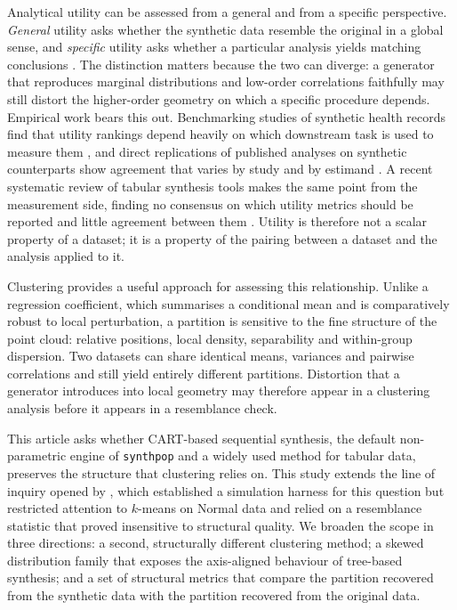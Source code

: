 \documentclass[pdflatex,sn-basic]{sn-jnl}
\begin{document}
Analytical utility can be assessed from a general and from a specific
perspective. \emph{General} utility asks whether the synthetic data resemble
the original in a global sense, and \emph{specific} utility asks whether a
particular analysis yields matching conclusions \citep{snoke2018}. The
distinction matters because the two can diverge: a generator that reproduces
marginal distributions and low-order correlations faithfully may still distort
the higher-order geometry on which a specific procedure depends. Empirical work
bears this out. Benchmarking studies of synthetic health records find that
utility rankings depend heavily on which downstream task is used to measure
them \citep{yan2022,elemam2022}, and direct replications of published analyses
on synthetic counterparts show agreement that varies by study and by estimand
\citep{reinerbenaim2020}. A recent systematic review of tabular synthesis tools
makes the same point from the measurement side, finding no consensus on which
utility metrics should be reported and little agreement between them
\citep{lautrup2024}. Utility is therefore not a scalar property of a dataset;
it is a property of the pairing between a dataset and the analysis applied to
it.

Clustering provides a useful approach for assessing this relationship. Unlike
a regression coefficient, which summarises a conditional mean and is
comparatively robust to local perturbation, a partition is sensitive to the
fine structure of the point cloud: relative positions, local density,
separability and within-group dispersion. Two datasets can share identical
means, variances and pairwise correlations and still yield entirely different
partitions. Distortion that a generator introduces into local geometry may
therefore appear in a clustering analysis before it appears in a resemblance
check.

This article asks whether CART-based sequential synthesis, the default
non-parametric engine of \texttt{synthpop} \citep{nowok2016} and a widely used
method for tabular data, preserves the structure that clustering relies on.
This study extends the line of inquiry opened by \citet{chen2025}, which
established a simulation harness for this question but restricted attention to
$k$-means on Normal data and relied on a resemblance statistic that proved
insensitive to structural quality. We broaden the scope in three directions: a
second, structurally different clustering method; a skewed distribution family
that exposes the axis-aligned behaviour of tree-based synthesis; and a set of
structural metrics that compare the partition recovered from the synthetic
data with the partition recovered from the original data.
\end{document}
